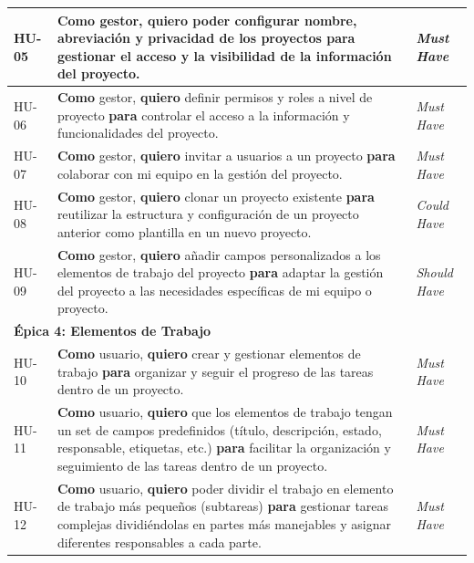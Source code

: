 \begin{longtable}{|p{1.5cm}|p{9cm}|p{3cm}|}
HU-05 &
\textbf{Como} gestor, \textbf{quiero} poder configurar nombre, abreviación y privacidad de los proyectos
\textbf{para} gestionar el acceso y la visibilidad de la información del proyecto.
& \emph{Must Have} \\
\hline

HU-06 &
\textbf{Como} gestor, \textbf{quiero} definir permisos y roles a nivel de proyecto
\textbf{para} controlar el acceso a la información y funcionalidades del proyecto.
& \emph{Must Have} \\
\hline

HU-07 &
\textbf{Como} gestor, \textbf{quiero} invitar a usuarios a un proyecto
\textbf{para} colaborar con mi equipo en la gestión del proyecto.
& \emph{Must Have} \\
\hline

HU-08 &
\textbf{Como} gestor, \textbf{quiero} clonar un proyecto existente
\textbf{para} reutilizar la estructura y configuración de un proyecto anterior como plantilla en un nuevo proyecto.
& \emph{Could Have} \\
\hline

HU-09 &
\textbf{Como} gestor, \textbf{quiero} añadir campos personalizados a los elementos de trabajo del proyecto
\textbf{para} adaptar la gestión del proyecto a las necesidades específicas de mi equipo o proyecto.
& \emph{Should Have} \\
\hline

\multicolumn{3}{|l|}{\cellcolor{gray!15}\textbf{Épica 4: Elementos de Trabajo}} \\
\hline

HU-10 &
\textbf{Como} usuario, \textbf{quiero} crear y gestionar elementos de trabajo 
\textbf{para} organizar y seguir el progreso de las tareas dentro de un proyecto.
& \emph{Must Have} \\
\hline

HU-11 &
\textbf{Como} usuario, \textbf{quiero} que los elementos de trabajo tengan un set de campos predefinidos (título, descripción, estado, responsable, etiquetas, etc.)
\textbf{para} facilitar la organización y seguimiento de las tareas dentro de un proyecto.
& \emph{Must Have} \\
\hline

HU-12 &
\textbf{Como} usuario, \textbf{quiero} poder dividir el trabajo en elemento de trabajo más pequeños (subtareas)
\textbf{para} gestionar tareas complejas dividiéndolas en partes más manejables
y asignar diferentes responsables a cada parte.
& \emph{Must Have} \\
\hline


\end{longtable}
